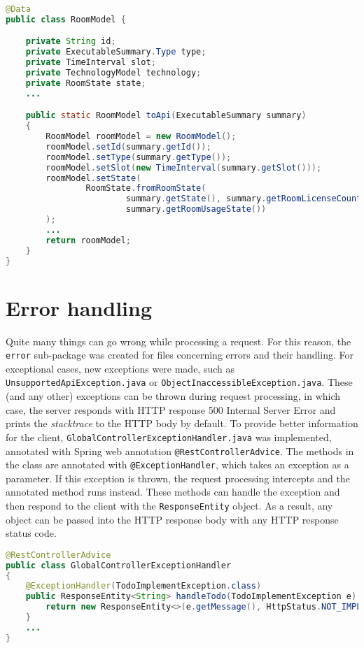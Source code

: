 \begin{lstlisting}[language=java, caption=RoomModel.java, label=lst:model]
@Data
public class RoomModel {

    private String id;
    private ExecutableSummary.Type type;
    private TimeInterval slot;
    private TechnologyModel technology;
    private RoomState state;
    ...

    public static RoomModel toApi(ExecutableSummary summary)
    {
        RoomModel roomModel = new RoomModel();
        roomModel.setId(summary.getId());
        roomModel.setType(summary.getType());
        roomModel.setSlot(new TimeInterval(summary.getSlot()));
        roomModel.setState(
                RoomState.fromRoomState(
                        summary.getState(), summary.getRoomLicenseCount(),
                        summary.getRoomUsageState())
        );
        ...
        return roomModel;
    }
}
\end{lstlisting}


\section{Error handling}
Quite many things can go wrong while processing a request. For this reason, the \texttt{error} sub-package was created for files concerning errors and their handling.
For exceptional cases, new exceptions were made, such as \texttt{UnsupportedApiException.java} or \texttt{ObjectInaccessibleException.java}.
These (and any other) exceptions can be thrown during request processing, in which case, the server responds with HTTP response 500 Internal Server Error and prints the \emph{stacktrace} to the HTTP body by default.
To provide better information for the client, \texttt{GlobalControllerExceptionHandler.java} was implemented, annotated with Spring web annotation \texttt{@RestControllerAdvice}.
The methods in the class are annotated with \texttt{@ExceptionHandler}, which takes an exception as a parameter. If this exception is thrown, the request processing intercepts and the annotated method runs instead.
These methods can handle the exception and then respond to the client with the \texttt{ResponseEntity} object. As a result, any object can be passed into the HTTP response body with any HTTP response status code.

\begin{lstlisting}[language=java, caption=GlobalControllerExceptionHandler.java, label=lst:err]
@RestControllerAdvice
public class GlobalControllerExceptionHandler
{
    @ExceptionHandler(TodoImplementException.class)
    public ResponseEntity<String> handleTodo(TodoImplementException e) {
        return new ResponseEntity<>(e.getMessage(), HttpStatus.NOT_IMPLEMENTED);
    }
    ...
}
\end{lstlisting}

